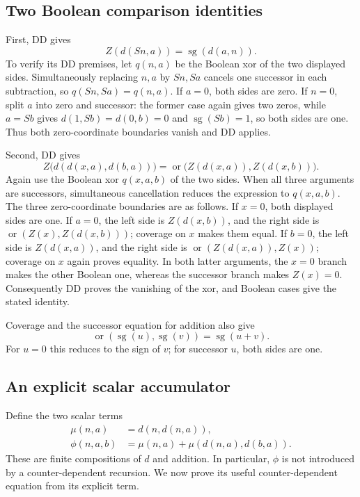 \documentclass[11pt]{article}
\begin{document}
\subsection{Two Boolean comparison identities}

First, DD gives
\[
 Z(d(Sn,a))=\operatorname{sg}(d(a,n)).
 \tag{B1}\label{eq:ur-strict-complement}
\]
To verify its DD premises, let $q(n,a)$ be the Boolean xor of the two
displayed sides. Simultaneously replacing $n,a$ by $Sn,Sa$ cancels one
successor in each subtraction, so $q(Sn,Sa)=q(n,a)$. If $a=0$, both
sides are zero. If $n=0$, split $a$ into zero and successor: the former
case again gives two zeros, while $a=Sb$ gives
$d(1,Sb)=d(0,b)=0$ and $\operatorname{sg}(Sb)=1$, so both sides are one.
Thus both zero-coordinate boundaries vanish and DD applies.

Second, DD gives
\[
 Z\bigl(d(d(x,a),d(b,a))\bigr)
 =\operatorname{or}\bigl(Z(d(x,a)),Z(d(x,b))\bigr).
 \tag{B2}\label{eq:ur-comparison-join}
\]
Again use the Boolean xor $q(x,a,b)$ of the two sides.
When all three arguments are successors, simultaneous cancellation
reduces the expression to $q(x,a,b)$.
The three zero-coordinate boundaries are as follows.
If $x=0$, both displayed sides are one.
If $a=0$, the left side is $Z(d(x,b))$, and the right side is
$\operatorname{or}(Z(x),Z(d(x,b)))$; coverage on $x$ makes them equal.
If $b=0$, the left side is $Z(d(x,a))$, and the right side is
$\operatorname{or}(Z(d(x,a)),Z(x))$; coverage on $x$ again proves equality.
In both latter arguments, the $x=0$ branch makes the other Boolean one,
whereas the successor branch makes $Z(x)=0$.
Consequently DD proves the vanishing of the xor, and Boolean cases
give the stated identity.

Coverage and the successor equation for addition also give
\[
 \operatorname{or}(\operatorname{sg}(u),\operatorname{sg}(v))
       =\operatorname{sg}(u+v).
 \tag{B3}\label{eq:ur-sign-or}
\]
For $u=0$ this reduces to the sign of $v$; for successor $u$, both
sides are one.

\subsection{An explicit scalar accumulator}

Define the two scalar terms
\begin{equation}
\begin{aligned}
 \mu(n,a)&=d(n,d(n,a)),\\
 \phi(n,a,b)&=\mu(n,a)+\mu(d(n,a),d(b,a)).
\end{aligned}
 \label{eq:ur-scalar-accumulator}
\end{equation}
These are finite compositions of $d$ and addition. In particular,
$\phi$ is not introduced by a counter-dependent recursion.
We now prove its useful counter-dependent equation from its explicit term.
\end{document}
